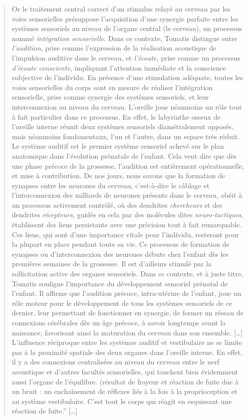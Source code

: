 \begin{quotation}
Or le traitement central correct d'un stimulus relayé au cerveau
par les voies sensorielles présuppose l'acquisition d'une synergie
parfaite entre les systèmes sensoriels au niveau de l'organe central
(le cerveau), un processus nommé \emph{intégration sensorielle}.
Dans ce contexte, Tomatis distingue entre \emph{l'audition},
prise comme l'expression de la réalisation acoustique de l'impulsion
auditive dans le cerveau, et \emph{l'écoute}, prise comme
un processus \emph{d'écoute consciente}, impliquant l'attention
immédiate et la conscience subjective de l'individu. En présence d'une
stimulation adéquate, toutes les voies sensorielles du corps sont
en mesure de réaliser l'intégration sensorielle, prise comme synergie
des systèmes sensoriels, et leur interconnexion au niveau du cerveau.
L'oreille joue néanmoins un rôle tout à fait particulier dans ce processus.
En effet, le labyrinthe osseux de l'oreille interne réunit deux systèmes
sensoriels diamétralement opposés, mais néanmoins fondamentaux, l'un
et l'autre, dans un espace très réduit. Le système auditif est le
premier système sensoriel achevé sur le plan anatomique dans l'évolution
prénatale de l'enfant. Cela veut dire que dès une phase précoce de
la grossesse, l'audition est entièrement opérationnelle, et mise à
contribution. De nos jours, nous savons que la formation de synapses
entre les neurones du cerveau, c'est-à-dire le câblage et l'interconnexion
des milliards de neurones présents dans le cerveau, obéit à un processus
activement contrôlé, où des dendrites \emph{chercheurs}
et des dendrites \emph{récepteurs}, guidés en cela par
des molécules dites \emph{neuro-tactiques}, établissent
des liens persistants avec une précision tout à fait remarquable.
Ces liens, qui sont d'une importance vitale pour l'individu, resteront
pour la plupart en place pendant toute sa vie. Ce processus de formation
de synapses ou d'interconnexion des neurones débute chez l'enfant
dès les premières semaines de la grossesse. Il est d'ailleurs stimulé
par la sollicitation active des organes sensoriels. Dans ce contexte,
et à juste titre, Tomatis souligne l'importance du développement sensoriel
prénatal de l'enfant. Il affirme que l'audition précoce, intra-utérine
de l'enfant, joue un rôle moteur pour le développement de tous les
systèmes sensoriels de ce dernier, leur permettant de fonctionner
en synergie, de former un réseau de connexions cérébrales dès un âge
précoce, à savoir longtemps avant la naissance, favorisant ainsi la
maturation du cerveau dans son ensemble. [\ldots] 
L'influence réciproque
entre les systèmes auditif et vestibulaire ne se limite pas à la proximité
spatiale des deux organes dans l'oreille interne. En effet, il y a
des connexions centralisées au niveau du cerveau entre le nerf acoustique
et d'autres facultés sensorielles, qui touchent bien évidemment aussi
l'organe de l'équilibre. (résultat de frayeur et réaction de fuite
due à un bruit : un enchaînement de réflexes liés à la fois à la proprioception
et au système vestibulaire. C'est tout le corps qui réagit en esquissant
une réaction de fuite.'' [\ldots]
\end{quotation}

